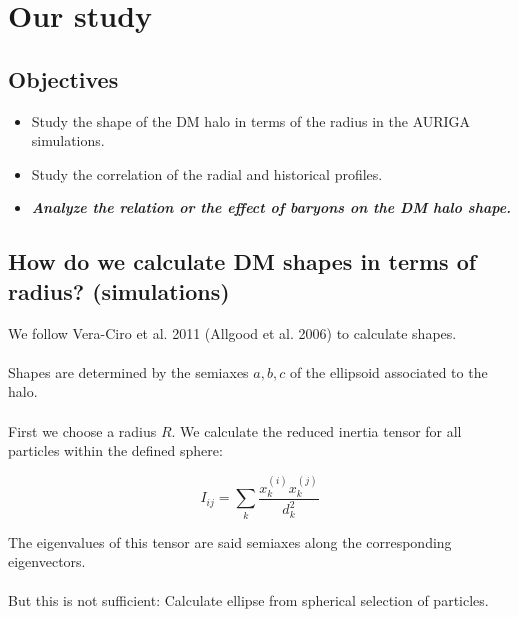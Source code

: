 \documentclass[xcolor=dvipsnames]{beamer}
\begin{document}
\section{Our study}
\subsection{Objectives}
\begin{frame}

\begin{itemize}
\item Study the shape of the DM halo in terms of the radius in the AURIGA simulations.

\item Study the correlation of the radial and historical profiles.

\item \textbf{\textit{Analyze the relation or the effect of baryons on the DM halo shape.}}

\end{itemize}

\end{frame}

\subsection{How do we calculate DM shapes in terms of radius? (simulations)}
\begin{frame}
\footnotesize
We follow Vera-Ciro et al. 2011 (Allgood et al. 2006) to calculate shapes.\\~\\

Shapes are determined by the semiaxes $a,b,c$ of the ellipsoid associated to the halo.\\~\\

First we choose a radius $R$. We calculate the reduced inertia tensor for all particles within the defined sphere:

\begin{equation}
I_{ij} = \sum_k \frac{x_k^{(i)}x_k^{(j)}}{d^2_k}
\end{equation}

The eigenvalues of this tensor are said semiaxes along the corresponding eigenvectors.\\~\\

But this is not sufficient: Calculate ellipse from spherical selection of particles.

\end{frame}
\end{document}

